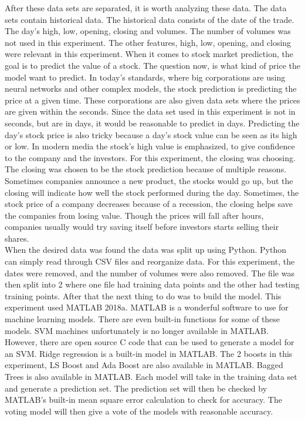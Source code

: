\documentclass[journal]{IEEEtran}
\begin{document}


After these data sets are separated, it is worth analyzing these data. The data sets contain historical data. The historical data consists of the date of the trade. The day's high, low, opening, closing and volumes. The number of volumes was not used in this experiment. The other features, high, low, opening, and closing were relevant in this experiment. When it comes to stock market prediction, the goal is to predict the value of a stock. The question now, is what kind of price the model want to predict. In today's standards, where big corporations are using neural networks and other complex models, the stock prediction is predicting the price at a given time. These corporations are also given data sets where the prices are given within the seconds. Since the data set used in this experiment is not in seconds, but are in days, it would be reasonable to predict in days. Predicting the day's stock price is also tricky because a day's stock value can be seen as its high or low. In modern media the stock's high value is emphasized, to give confidence to the company and the investors. For this experiment, the closing was choosing. The closing was chosen to be the stock prediction because of multiple reasons. Sometimes companies announce a new product, the stocks would go up, but the closing will indicate how well the stock performed during the day. Sometimes, the stock price of a company decreases because of a recession, the closing helps save the companies from losing value. Though the prices will fall after hours, companies usually would try saving itself before investors starts selling their shares. \\

When the desired data was found the data was split up using Python. Python can simply read through CSV files and reorganize data. For this experiment, the dates were removed, and the number of volumes were also removed. The file was then split into 2 where one file had training data points and the other had testing training points. After that the next thing to do was to build the model. This experiment used MATLAB 2018a. MATLAB is a wonderful software to use for machine learning models. There are even built-in functions for some of these models. SVM machines unfortunately is no longer available in MATLAB. However, there are open source C code that can be used to generate a model for an SVM. Ridge regression is a built-in model in MATLAB. The 2 boosts in this experiment, LS Boost and Ada Boost are also available in MATLAB. Bagged Trees is also available in MATLAB. Each model will take in the training data set and generate a prediction set. The prediction set will then be checked by MATLAB's built-in mean square error calculation to check for accuracy. The voting model will then give a vote of the models with reasonable accuracy. 
\end{document}
